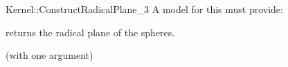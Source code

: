 \begin{ccRefFunctionObjectConcept}{Kernel::ConstructRadicalPlane_3}
A model for this must provide:


       {returns the radical plane of the spheres.
	}

\ccRefines
{} (with one argument)

\ccSeeAlso
{} \\

\end{ccRefFunctionObjectConcept}

